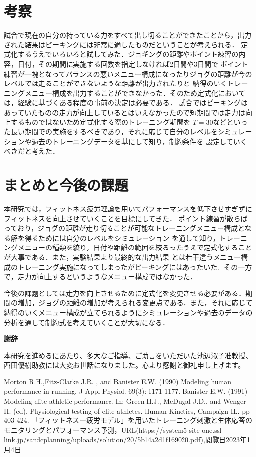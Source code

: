 \documentclass[12pt,fleqn]{jreport}
\begin{document}
\chapter{考察}
\vspace{2cm}
試合で現在の自分の持っている力をすべて出し切ることができたことから，出力された結果はピーキングには非常に適したものだということが考えられる．
定式化するうえでいろいろと試してみた．ジョギングの距離やポイント練習の内容，日付，その期間に実施する回数を指定しなければ2日間や3日間で
ポイント練習が一塊となってバランスの悪いメニュー構成になったりジョグの距離が今のレベルでは走ることができないような距離が出力されたりと
納得のいくトレーニングメニュー構成を出力することができなかった．そのため定式化においては，経験に基づくある程度の事前の決定は必要である．
試合ではピーキングはあっていたものの走力が向上しているとはいえなかったので短期間では走力は向上するものではないため定式化する際のトレーニング期間を
$T=30$などといった長い期間での実施をするべきであり，それに応じて自分のレベルをシミュレーションや過去のトレーニングデータを基にして知り，制約条件を
設定していくべきだと考えた．
\newpage
\chapter{まとめと今後の課題}
\vspace{1cm}
本研究では，フィットネス疲労理論を用いてパフォーマンスを低下させすぎずにフィットネスを向上させていくことを目標にしてきた．
ポイント練習が散らばっており，ジョグの距離が走り切ることが可能なトレーニングメニュー構成となる解を得るためには自分のレベルをシミュレーション
を通して知り，トレーニングメニューの種類を絞り，日付や距離の範囲を絞るったうえで定式化することが大事である．また，実験結果より最終的な出力結果
とは若干違うメニュー構成のトレーニング実施になってしまったがピーキングにはあったいた．その一方で，走力が向上するというようなメニュー構成ではなかった．
\par 今後の課題としては走力を向上させるために定式化を変更させる必要がある．期間の増加，ジョグの距離の増加が考えられる変更点である．また，それに応じて
納得のいくメニュー構成が立てられるようにシミュレーションや過去のデータの分析を通して制約式を考えていくことが大切になる．

\newpage
\begin{flushleft}
  {\Huge\textbf{謝辞}}
\end{flushleft}
\vspace{2cm}
本研究を進めるにあたり、多大なご指導、ご助言をいただいた池辺淑子准教授、西田優樹助教には大変お世話になりました。心より感謝と御礼申し上げます。
\newpage
\begin{thebibliography}{99}
  Morton R.H.,Fitz-Clarke J.R. , and Banister E.W. (1990) Modeling human performance in running. J Appl Physiol. 69(3): 1171-1177.
  Banister E.W. (1991) Modeling elite athletic performance. In: Green H.J., McDugal J.D., and Wenger H. (ed). Physiological testing of elite athletes. Human Kinetics, Campaign IL. pp 403-424.
  「フィットネスー疲労モデル」を用いたトレーニング刺激と生体応答のモニタリングとパフォーマンス予測，URL(https://system5-site-one.ssl-link.jp/sandcplanning/uploads/solution/20/5b14a2d1f169020.pdf),閲覧日2023年1月4日
\end{thebibliography}
\end{document}
